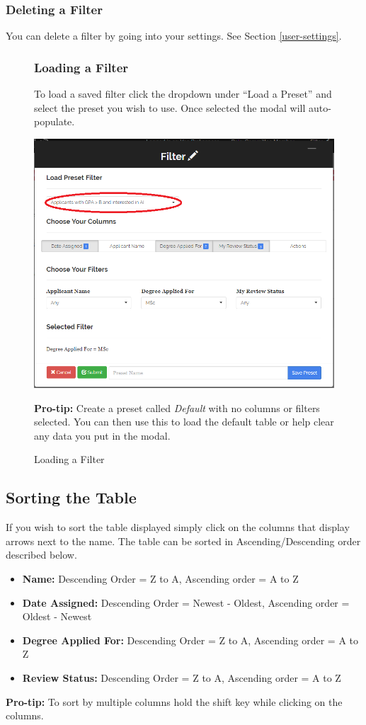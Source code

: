 \documentclass[fontsize=12pt,paper=letter,twoside]{scrartcl}
\begin{document}
\subsubsection{Deleting a Filter}
You can delete a filter by going into your settings. See Section \ref{user-settings}.
\begin{figure}[!htb]
\subsubsection{Loading a Filter}
To load a saved filter click the dropdown under ``Load a Preset'' and select the preset you wish to use. Once selected the modal will auto-populate.
\begin{center}
\includegraphics[width=.99\textwidth]{images/load_preset.png}
\end{center}
\caption{Loading a Filter}
\textbf{Pro-tip:} Create a preset called \emph{Default} with no columns or filters selected. You can then use this to load the default table or help clear any data you put in the modal.
\label{fig:save_filter}
\end{figure}
\clearpage
\newpage
\subsection{Sorting the Table}
If you wish to sort the table displayed simply click on the columns that display arrows next to the name. The table can be sorted in Ascending/Descending order described below.
\begin{itemize}
\item \textbf{Name:} Descending Order = Z to A, Ascending order = A to Z
\item \textbf{Date Assigned:} Descending Order = Newest - Oldest, Ascending order = Oldest - Newest
\item \textbf{Degree Applied For:} Descending Order = Z to A, Ascending order = A to Z
\item \textbf{Review Status:} Descending Order = Z to A, Ascending order = A to Z
\end{itemize}
\textbf{Pro-tip:} To sort by multiple columns hold the shift key while clicking on the columns.
\end{document}
